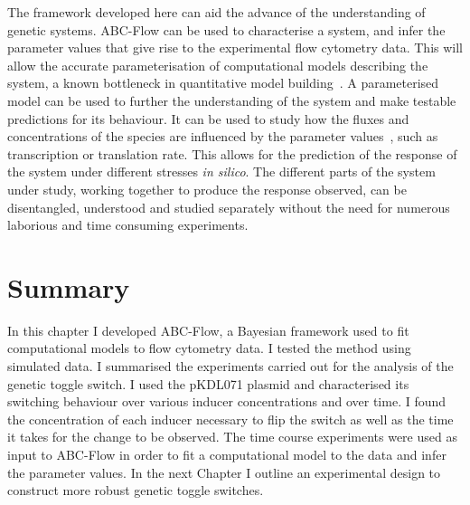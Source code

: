 The framework developed here can aid the advance of the understanding of genetic systems. ABC-Flow can be used to characterise a system, and infer the parameter values that give rise to the experimental flow cytometry data. This will allow the accurate parameterisation of computational models describing the system, a known bottleneck in quantitative model building~\autocite{LeNovere:2015dp}. A parameterised model can be used to further the understanding of the system and make testable predictions for its behaviour. It can be used to study how the fluxes and concentrations of the species are influenced by the parameter values~\autocite{Li:2010kt}, such as transcription or translation rate. This allows for the prediction of the response of the system under different stresses \textit{in silico}. The different parts of the system under study, working together to produce the response observed, can be disentangled, understood and studied separately without the need for numerous laborious and time consuming experiments. 


\section{Summary}


In this chapter I developed ABC-Flow, a Bayesian framework used to fit computational models to flow cytometry data. I tested the method using simulated data. I summarised the experiments carried out for the analysis of the genetic toggle switch. I used the pKDL071 plasmid and characterised its switching behaviour over various inducer concentrations and over time. I found the concentration of each inducer necessary to flip the switch as well as the time it takes for the change to be observed. The time course experiments were used as input to ABC-Flow in order to fit a computational model to the data and infer the parameter values. In the next Chapter I outline an experimental design to construct more robust genetic toggle switches.







 
 